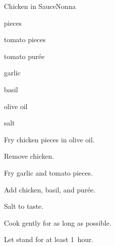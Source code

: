 \begin{recipe}{Chicken in Sauce}{Nonna}{}

\begin{ingredients}
\item {} pieces
\item tomato pieces
\item tomato pur\'ee
\item garlic
\item basil
\item olive oil
\item salt
\end{ingredients}

\begin{directions}
\item Fry chicken pieces in olive oil.
\item Remove chicken.
\item Fry garlic and tomato pieces.
\item Add chicken, basil, and pur\'ee.
\item Salt to taste.
\item Cook gently for as long as possible.
\item Let stand for at least 1~hour.
\end{directions}

\end{recipe}
